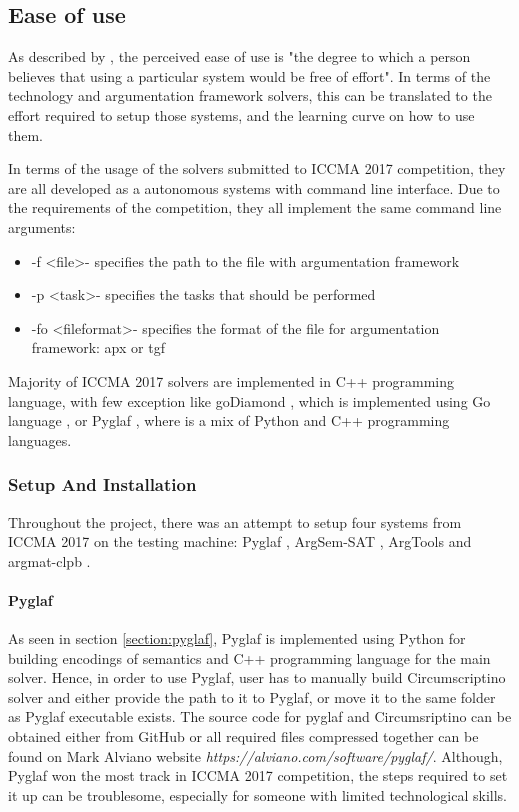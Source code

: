 
\subsection{Ease of use}
As described by \citet{easeOfUse}, the perceived ease of use is "the degree to which a person believes that using a particular system would be free of effort". In terms of the technology and argumentation framework solvers, this can be translated to the effort required to setup those systems, and the learning curve on how to use them. 

In terms of the usage of the solvers submitted to ICCMA 2017 competition, they are all developed as a autonomous systems with command line interface. Due to the requirements of the competition, they all implement the same command line arguments:

\begin{itemize}
	\item -f \textless file\textgreater - specifies the path to the file with argumentation framework
	\item -p \textless task\textgreater - specifies the tasks that should be performed
	\item -fo \textless fileformat\textgreater - specifies the format of the file for argumentation framework: apx or tgf
\end{itemize}

Majority of ICCMA 2017 solvers are implemented in C++ programming language, with few exception like goDiamond \citep{goDiamond}, which is implemented using Go language \citep{GoLang}, or Pyglaf \citep{pyglaf}, where is a mix of Python and C++ programming languages. 



\subsubsection{Setup And Installation}
Throughout the project, there was an attempt to setup four systems from ICCMA 2017 on the testing machine: Pyglaf \citep{pyglaf}, ArgSem-SAT \citep{argsemsat}, ArgTools \citep{argtools} and argmat-clpb \citep{argmat-clpb}. 

\paragraph{Pyglaf}
As seen in section \ref{section:pyglaf}, Pyglaf is implemented using Python for building encodings of semantics and C++ programming language for the main solver. Hence, in order to use Pyglaf, user has to manually build Circumscriptino \citep{circumscriptino} solver and either provide the path to it to Pyglaf, or move it to the same folder as Pyglaf executable exists. The source code for pyglaf and Circumsriptino can be obtained either from GitHub or all required files compressed together can be found on Mark Alviano website \textit{https://alviano.com/software/pyglaf/}. Although, Pyglaf won the most track in ICCMA 2017 competition, the steps required to set it up can be troublesome, especially for someone with limited technological skills. 

